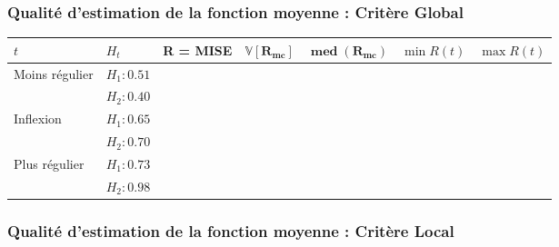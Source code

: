 \subsubsection{Qualité d'estimation de la fonction moyenne : Critère Global}

\begin{table}[H]
	\centering
	\begin{tabularx}{\textwidth}{|X|X|X|X|X|X|X|}
		\toprule
		$t$                                  & $H_t$        & \textbf{R = MISE} & $\mathbf{\mathds V[R_{mc}]}$ & $\mathbf{\operatorname{med}(R_{mc})}$ & $\min R(t)$ & $\max R(t)$ \\
		\midrule
		\multirow{2}{\hsize}{Moins régulier} & $H_1 : 0.51$ &                   &                              &                                       &             &
		\\
		                                     & $H_2 : 0.40$ &                   &                              &                                       &             &
		\\
		\midrule
		\multirow{2}{\hsize}{Inflexion}      & $H_1 : 0.65$ &                   &                              &                                       &             &
		\\
		                                     & $H_2 : 0.70$ &                   &                              &                                       &             &
		\\
		\midrule
		\multirow{2}{\hsize}{Plus régulier}  & $H_1 : 0.73$ &                   &                              &                                       &             &
		\\
		                                     & $H_2 : 0.98$ &                   &                              &                                       &             &
		\\
		\bottomrule
	\end{tabularx}
\end{table}

\subsubsection{Qualité d'estimation de la fonction moyenne : Critère Local}

